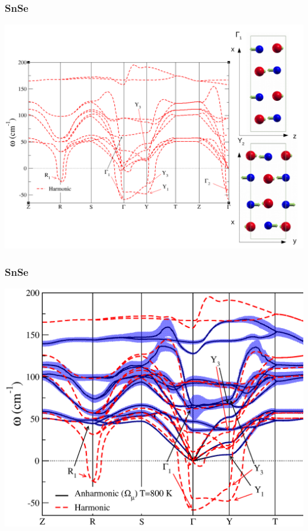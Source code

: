 \documentclass{beamer}
\begin{document}

\begin{frame}

\frametitle{SnSe}
\begin{center}
 \includegraphics[width=0.85\linewidth]{Pictures/SnSe/figure4.pdf}
\end{center}

\end{frame}


\begin{frame}

\frametitle{SnSe}
\begin{center}
 \includegraphics[width=0.85\linewidth]{Pictures/SnSe/spectrum-snse.eps}
\end{center}
 
\end{frame}
\end{document}
